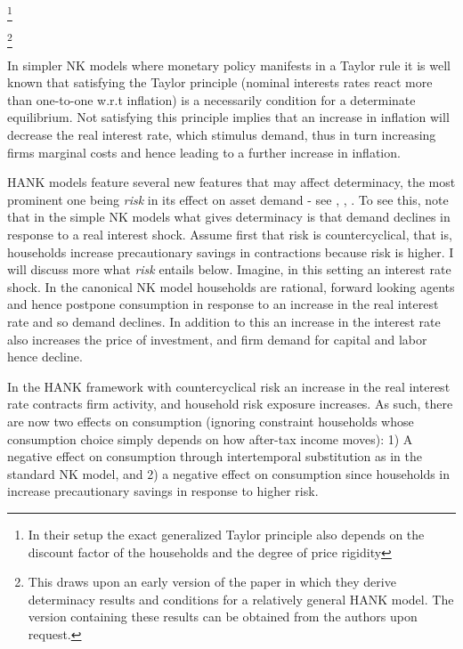 

\footnote{In their setup the exact generalized Taylor principle also depends on the discount factor of the households and the degree of price rigidity}


\footnote{This draws upon an early version of the paper \citet{auclert2018intertemporal} in which they derive determinacy results and conditions for a relatively general HANK model. The version containing these results can be obtained from the authors upon request. }







In simpler NK models where monetary policy manifests in a Taylor rule it is well known that satisfying the Taylor principle (nominal interests rates react more than one-to-one w.r.t inflation) is a necessarily condition for a determinate equilibrium. Not satisfying this principle implies that an increase in inflation will decrease the real interest rate, which stimulus demand, thus in turn increasing firms marginal costs and hence leading to a further increase in inflation. 

HANK models feature several new features that may affect determinacy, the most prominent one being \textit{risk} in its effect on asset demand - see \citet{ravn2016macroeconomic}, \citet{bilbiie2018monetary}, \citet{acharya2020understanding}. 
To see this, note that in the simple NK models what gives determinacy is that demand declines in response to a real interest shock. Assume first that risk is countercyclical, that is, households increase precautionary savings in contractions because risk is higher. I will discuss more what \textit{risk} entails below. Imagine, in this setting an interest rate shock. In the canonical NK model households are rational, forward looking agents and hence postpone consumption in response to an increase in the real interest rate and so demand declines. In addition to this an increase in the interest rate also increases the price of investment, and firm demand for capital and labor hence decline. 

In the HANK framework with countercyclical risk an increase in the real interest rate contracts firm activity, and household risk exposure increases. As such, there are now two effects on consumption (ignoring constraint households whose consumption choice simply depends on how after-tax income moves): 1) A negative effect on consumption through intertemporal substitution as in the standard NK model, and 2) a negative effect on consumption since households in increase precautionary savings in response to higher risk.      


